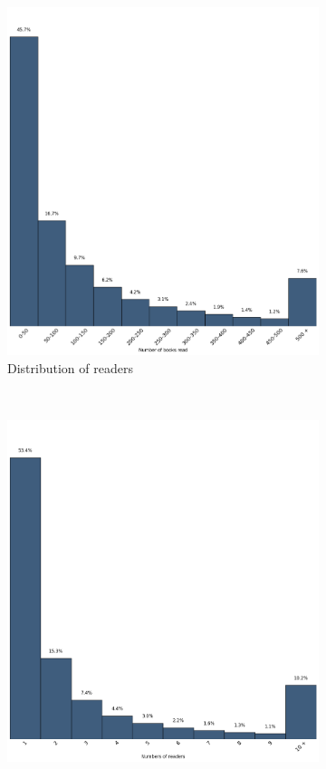 \documentclass[11pt]{article}
\begin{document}
\begin{figure}[ht]
        \centering
        \begin{subfigure}[b]{0.5\textwidth}
                \includegraphics[width=\textwidth]{images/users}
                \caption{Distribution of readers}
                \label{fig:readers_book_read}
        \end{subfigure}%
        ~ %
        \begin{subfigure}[b]{0.5\textwidth}
                \includegraphics[width=\textwidth]{images/books}

\end{subfigure}
\end{figure}
\end{document}
